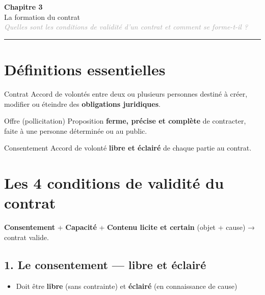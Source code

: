 \documentclass[11pt,a4paper]{article}
\begin{document}
\begin{center}
  {\Large\bfseries\textcolor{mainColor}{Chapitre 3}}\\[2pt]
  {\large La formation du contrat}\\[4pt]
  \textit{\textcolor{darkGray}{Quelles sont les conditions de validité d'un contrat et comment se forme-t-il ?}}
\end{center}
\vspace{4pt}\hrule\vspace{8pt}

\section*{Définitions essentielles}

\begin{defbox}{Contrat}
Accord de volontés entre deux ou plusieurs personnes destiné à créer, modifier ou éteindre des \textbf{obligations juridiques}.
\end{defbox}

\vspace{4pt}
\begin{defbox}{Offre (pollicitation)}
Proposition \textbf{ferme, précise et complète} de contracter, faite à une personne déterminée ou au public.
\end{defbox}

\vspace{4pt}
\begin{defbox}{Consentement}
Accord de volonté \textbf{libre et éclairé} de chaque partie au contrat.
\end{defbox}

\section*{Les 4 conditions de validité du contrat}

\begin{keybox}
\textbf{Consentement} + \textbf{Capacité} + \textbf{Contenu licite et certain} (objet + cause) → contrat valide.
\end{keybox}

\subsection*{1. Le consentement — libre et éclairé}
\begin{itemize}
  \item Doit être \textbf{libre} (sans contrainte) et \textbf{éclairé} (en connaissance de cause)
\end{itemize}
\end{document}
